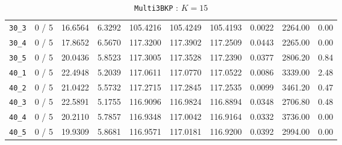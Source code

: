 \begin{table}[h!]
\begin{center}
\begin{tabular}{| c | c | c | c | c | c | c | c | c | c |}
\verb|30_3| & 0 / 5 & 16.6564 & 6.3292 & 105.4216 & 105.4249 & 105.4193 & 0.0022 & 2264.00 & 0.00\\ 
\verb|30_4| & 0 / 5 & 17.8652 & 6.5670 & 117.3200 & 117.3902 & 117.2509 & 0.0443 & 2265.00 & 0.00\\ 
\verb|30_5| & 0 / 5 & 20.0436 & 5.8523 & 117.3005 & 117.3528 & 117.2390 & 0.0377 & 2806.20 & 0.84\\ 
\verb|40_1| & 0 / 5 & 22.4948 & 5.2039 & 117.0611 & 117.0770 & 117.0522 & 0.0086 & 3339.00 & 2.48\\ 
\verb|40_2| & 0 / 5 & 21.0422 & 5.5732 & 117.2715 & 117.2845 & 117.2535 & 0.0099 & 3461.20 & 0.47\\ 
\verb|40_3| & 0 / 5 & 22.5891 & 5.1755 & 116.9096 & 116.9824 & 116.8894 & 0.0348 & 2706.80 & 0.48\\ 
\verb|40_4| & 0 / 5 & 20.2110 & 5.7857 & 116.9348 & 117.0042 & 116.9164 & 0.0332 & 3736.00 & 0.00\\ 
\verb|40_5| & 0 / 5 & 19.9309 & 5.8681 & 116.9571 & 117.0181 & 116.9200 & 0.0392 & 2994.00 & 0.00\\ 
\hline
\end{tabular}
\caption{\texttt{Multi3BKP} : $K=15$}
\label{table:multi:15}
\end{center}
\end{table}




